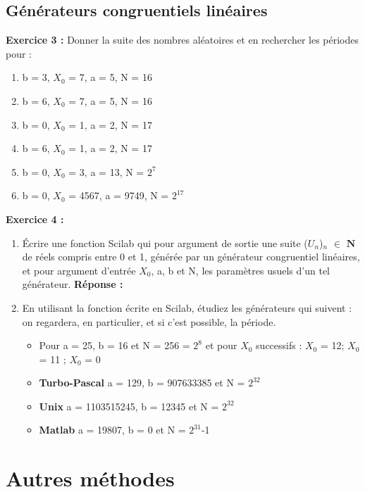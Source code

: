\documentclass[oneside]{book}
\begin{document}
\subsection{Générateurs congruentiels linéaires}
\textbf{Exercice 3 :}
Donner la suite des nombres aléatoires et en rechercher les périodes pour : 
\begin{enumerate}
	\item b = 3, $X_0$ = 7, a = 5, N = 16 
	\item b = 6, $X_0$ = 7, a = 5, N = 16 
	\item b = 0, $X_0$ = 1, a = 2, N = 17 
	\item b = 6, $X_0$ = 1, a = 2, N = 17 
	\item b = 0, $X_0$ = 3, a = 13, N = $2^7$ 
	\item b = 0, $X_0$ = 4567, a = 9749, N = $2^{17}$ 
\end{enumerate}
\newpage
\textbf{Exercice 4 :}
\begin{enumerate}
	\item Écrire une fonction Scilab qui pour argument de sortie une suite ($U_{n}$)$_{n}$ $\in$ $\mathbf{N}$ de réels compris entre 0 et 1, générée par un générateur congruentiel linéaires, et pour argument d'entrée $X_0$, a, b et N, les paramètres usuels d'un tel générateur.\newline
\textbf{Réponse :} 

	\item En utilisant la fonction écrite en Scilab, étudiez les générateurs qui suivent : on regardera, en particulier, et si c'est possible, la période.
	\begin{itemize}
		\item Pour a = 25, b = 16 et N = 256 = $2^8$ et pour $X_0$ successifs : $X_0$ = 12; $X_0$ = 11 ; $X_0$ = 0
		\item \textbf{Turbo-Pascal} a = 129, b = 907633385 et N = $2^{32}$
		\item \textbf{Unix} a = 1103515245, b = 12345 et N = $2^{32}$
		\item \textbf{Matlab} a = 19807, b = 0 et N = $2^{31}$-1
	\end{itemize}
\end{enumerate}
\section{Autres méthodes}
\end{document}
